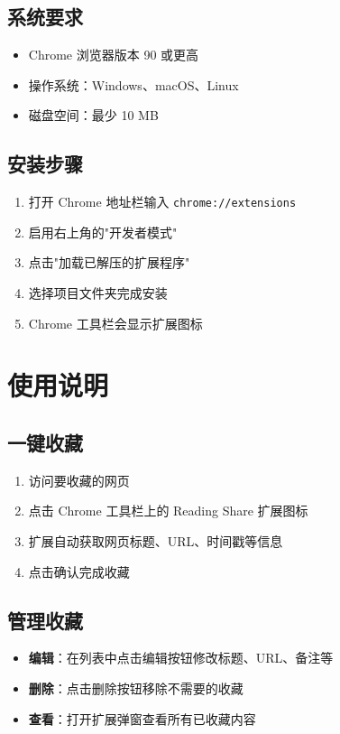 \documentclass[10pt,a4paper]{article}
\begin{document}
\subsection{系统要求}
\begin{itemize}
  \item Chrome 浏览器版本 90 或更高
  \item 操作系统：Windows、macOS、Linux
  \item 磁盘空间：最少 10 MB
\end{itemize}

\subsection{安装步骤}
\begin{enumerate}
  \item 打开 Chrome 地址栏输入 \texttt{chrome://extensions}
  \item 启用右上角的"开发者模式"
  \item 点击"加载已解压的扩展程序"
  \item 选择项目文件夹完成安装
  \item Chrome 工具栏会显示扩展图标
\end{enumerate}

\vspace{5pt}

\section{使用说明}

\subsection{一键收藏}
\begin{enumerate}
  \item 访问要收藏的网页
  \item 点击 Chrome 工具栏上的 Reading Share 扩展图标
  \item 扩展自动获取网页标题、URL、时间戳等信息
  \item 点击确认完成收藏
\end{enumerate}

\subsection{管理收藏}
\begin{itemize}
  \item \textbf{编辑}：在列表中点击编辑按钮修改标题、URL、备注等
  \item \textbf{删除}：点击删除按钮移除不需要的收藏
  \item \textbf{查看}：打开扩展弹窗查看所有已收藏内容
\end{itemize}
\end{document}
